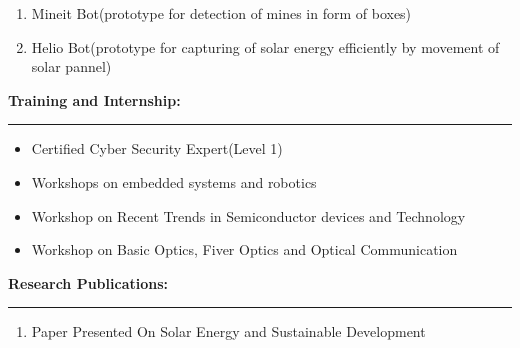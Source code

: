 \documentclass[a4paper,10pt]{article}
\begin{document}
\begin{flushleft}
\begin{enumerate}
      	\item  Mineit Bot(prototype for detection of mines in form of boxes)
      	\item  Helio Bot(prototype for capturing of solar energy efficiently by movement of solar pannel)
      \end{enumerate}
  \textbf{\large Training and Internship:}\\
  \hrule
   \begin{itemize}
   	\item  Certified Cyber Security Expert(Level 1) \\
   	\item  Workshops on embedded systems and robotics\\
   	\item  Workshop on Recent Trends in Semiconductor devices and Technology\\
   	\item  Workshop on Basic Optics, Fiver Optics and Optical Communication\\
   \end{itemize}
   \textbf{\large Research Publications:} \\ 
  \hrule
   \begin{enumerate}
   	\item  Paper Presented On Solar Energy and Sustainable Development \\
   \end{enumerate}
\end{flushleft}
\end{document}
